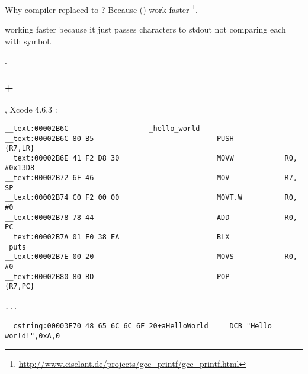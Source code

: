 {Why compiler replaced \printf to \puts? Because \puts() work faster}
\footnote{\url{http://www.ciselant.de/projects/gcc_printf/gcc_printf.html}}. 

{\puts working faster because it just passes characters to stdout not comparing each with \IT{\%} symbol.}

 .

\subsubsection{\OptimizingXcode + \ThumbTwoMode}

, Xcode 4.6.3 :

\begin{lstlisting}[caption=\OptimizingXcode + \ThumbTwoMode]
__text:00002B6C                   _hello_world
__text:00002B6C 80 B5                             PUSH            {R7,LR}
__text:00002B6E 41 F2 D8 30                       MOVW            R0, #0x13D8
__text:00002B72 6F 46                             MOV             R7, SP
__text:00002B74 C0 F2 00 00                       MOVT.W          R0, #0
__text:00002B78 78 44                             ADD             R0, PC
__text:00002B7A 01 F0 38 EA                       BLX             _puts
__text:00002B7E 00 20                             MOVS            R0, #0
__text:00002B80 80 BD                             POP             {R7,PC}

...

__cstring:00003E70 48 65 6C 6C 6F 20+aHelloWorld     DCB "Hello world!",0xA,0
\end{lstlisting}

